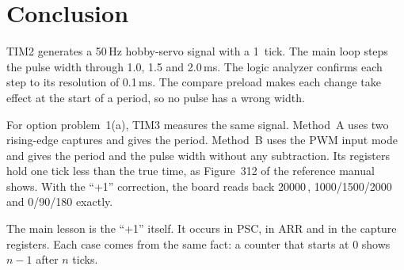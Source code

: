 \documentclass[11pt,a4paper]{article}
\newcommand{\us}{\,\text{\textmu s}}
\newcommand{\dg}{\text{\textdegree}}
\begin{document}
\section{Conclusion}

TIM2 generates a 50\,Hz hobby-servo signal with a 1\us{} tick. The main loop
steps the pulse width through 1.0, 1.5 and 2.0\,ms. The logic analyzer
confirms each step to its resolution of 0.1\,ms. The compare preload makes
each change take effect at the start of a period, so no pulse has a wrong
width.

For option problem~1(a), TIM3 measures the same signal. Method~A uses two
rising-edge captures and gives the period. Method~B uses the PWM input mode
and gives the period and the pulse width without any subtraction. Its
registers hold one tick less than the true time, as Figure~312 of the
reference manual shows. With the ``+1'' correction, the board reads back
20000\us, 1000/1500/2000\us{} and 0/90/180\dg{} exactly.

The main lesson is the ``+1'' itself. It occurs in PSC, in ARR and in the
capture registers. Each case comes from the same fact: a counter that starts
at 0 shows $n-1$ after $n$ ticks.
\end{document}
